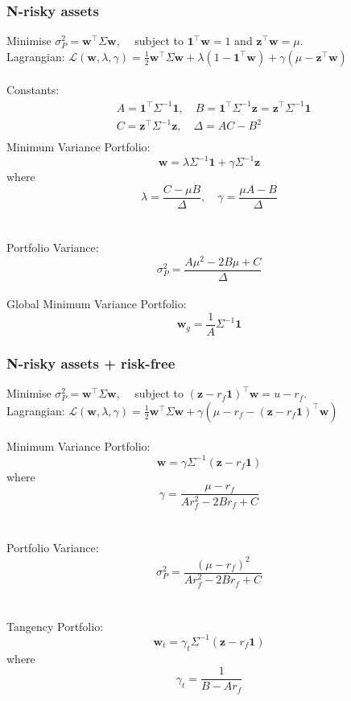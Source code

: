 \documentclass[11pt]{article}
\begin{document}
	\subsubsection{N-risky assets}
	Minimise \( \displaystyle\sigma_P^2 = \bm{w}^{\top} \Sigma \bm{w} \), \( \quad \)subject to \( \bm{1}^{\top}\bm{w}= 1 \) and \( \bm{z}^{\top}\bm{w}=\mu \).\\[5pt]
	Lagrangian: \( \mathcal{L}(\bm{w}, \lambda, \gamma)  = \frac{1}{2} \bm{w}^{\top} \Sigma \bm{w} + \lambda (1 - \bm{1}^{\top}\bm{w}) + \gamma (\mu - \bm{z}^{\top}\bm{w})\)\\\\
	Constants: \begin{align*}
				&	A = \bm{1}^{\top}\Sigma^{-1}\bm{1},\quad B =  \bm{1}^{\top}\Sigma^{-1}\bm{z} = \bm{z}^{\top}\Sigma^{-1}\bm{1}\\[2pt]
				&	C = \bm{z}^{\top}\Sigma^{-1}\bm{z}, \quad\Delta = AC - B^2\\
				\end{align*} 
	Minimum Variance Portfolio: 
	\[ \displaystyle\bm{w} = \lambda \Sigma^{-1} \bm{1} + \gamma \Sigma^{-1}\bm{z}  \]where \[ \lambda = \frac{C - \mu B}{\Delta}, \quad\gamma = \frac{\mu A - B}{\Delta} \]\\\\
	Portfolio Variance: \[ \sigma_P^2 = \frac{A\mu^2 -2B\mu + C}{\Delta} \]\\
	Global Minimum Variance Portfolio: \[ \bm{w}_g = \frac{1}{A}\Sigma^{-1}\bm{1} \]
	
	\subsubsection{N-risky assets + risk-free}
	Minimise \( \sigma_P^2 = \bm{w}^{\top} \Sigma \bm{w} \), \( \quad \)subject to \( (\bm{z} - r_{f}\bm{1})^{\top}\bm{w} = u - r_f \).\\[5pt]
	Lagrangian: \( \mathcal{L}(\bm{w}, \lambda, \gamma)  = \frac{1}{2}\bm{w}^{\top}\Sigma\bm{w} + \gamma(\mu - r_f - (\bm{z} - r_f \bm{1})^{\top}\bm{w}) \)\\\\
	Minimum Variance Portfolio: \[ \bm{w} = \gamma\Sigma^{-1}(\bm{z} - r_f \bm{1}) \] where \[ \gamma = \frac{\mu - r_f}{A r_f^2 -2B r_f + C} \]\\\\
	Portfolio Variance: \[ \sigma_P^2 = \frac{(\mu - r_f)^2}{A r_f^2 -2B r_f + C} \]\\\\
	Tangency Portfolio: \[ \bm{w}_t = \gamma_t \Sigma^{-1}(\bm{z} - r_f \bm{1}) \] where \[ \gamma_t = \frac{1}{B - Ar_f} \]
\end{document}
